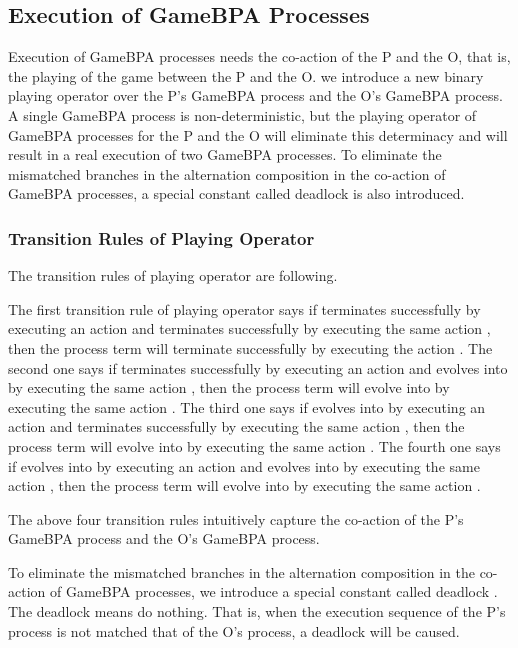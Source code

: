\documentclass{fac}
\begin{document}
\subsection{Execution of GameBPA Processes}

Execution of GameBPA processes needs the co-action of the P and the O, that is, the playing of the game between the P and the O. we introduce a new binary playing operator  over the P's GameBPA process and the O's GameBPA process. A single GameBPA process is non-deterministic, but the playing operator  of GameBPA processes for the P and the O will eliminate this determinacy and will result in a real execution of two GameBPA processes. To eliminate the mismatched branches in the alternation composition in the co-action of GameBPA processes, a special constant called deadlock  is also introduced.

\subsubsection{Transition Rules of Playing Operator}

The transition rules of playing operator  are following.









The first transition rule of playing operator  says if  terminates successfully by executing an action  and  terminates successfully by executing the same action , then the process term  will terminate successfully by executing the action . The second one says if  terminates successfully by executing an action  and  evolves into  by executing the same action , then the process term  will evolve into  by executing the same action . The third one says if  evolves into  by executing an action  and  terminates successfully by executing the same action , then the process term  will evolve into  by executing the same action . The fourth one says if  evolves into  by executing an action  and  evolves into  by executing the same action , then the process term  will evolve into  by executing the same action .

The above four transition rules intuitively capture the co-action of the P's GameBPA process and the O's GameBPA process.

To eliminate the mismatched branches in the alternation composition in the co-action of GameBPA processes, we introduce a special constant called deadlock . The deadlock  means do nothing. That is, when the execution sequence of the P's process is not matched that of the O's process, a deadlock will be caused.
\end{document}
